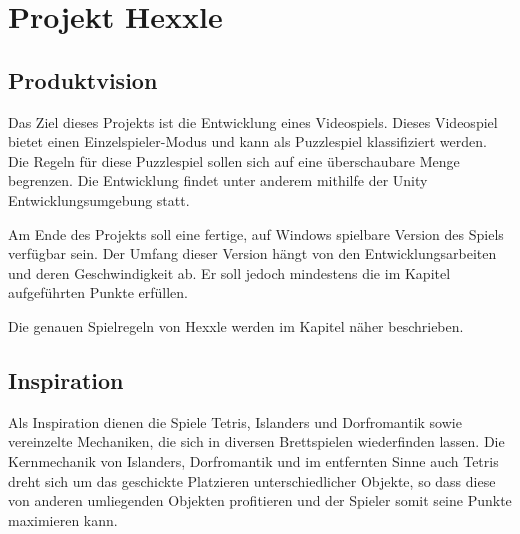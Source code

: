 \documentclass[../main.tex]{subfiles}
\begin{document}
	\section{Projekt Hexxle}
	\subsection{Produktvision}
	\label{section:Produktvision}
	\par Das Ziel dieses Projekts ist die Entwicklung eines Videospiels. Dieses Videospiel bietet einen Einzelspieler-Modus und kann als Puzzlespiel klassifiziert werden. Die Regeln für diese Puzzlespiel sollen sich auf eine überschaubare Menge begrenzen. Die Entwicklung findet unter anderem mithilfe der Unity Entwicklungsumgebung statt. 
	\par Am Ende des Projekts soll eine fertige, auf Windows  spielbare Version des Spiels verfügbar sein. Der Umfang dieser Version hängt von den Entwicklungsarbeiten und deren Geschwindigkeit ab. Er soll jedoch mindestens die im Kapitel  aufgeführten Punkte erfüllen.
	\par Die genauen Spielregeln von Hexxle  werden im Kapitel  näher beschrieben.
	\subsection{Inspiration}
	\par Als Inspiration dienen die Spiele Tetris, Islanders und Dorfromantik  sowie vereinzelte Mechaniken, die sich in diversen Brettspielen wiederfinden lassen. Die Kernmechanik von Islanders, Dorfromantik und im entfernten Sinne auch Tetris dreht sich um das geschickte Platzieren unterschiedlicher Objekte, so dass diese von anderen umliegenden Objekten profitieren und der Spieler somit seine Punkte maximieren kann.
\end{document}
